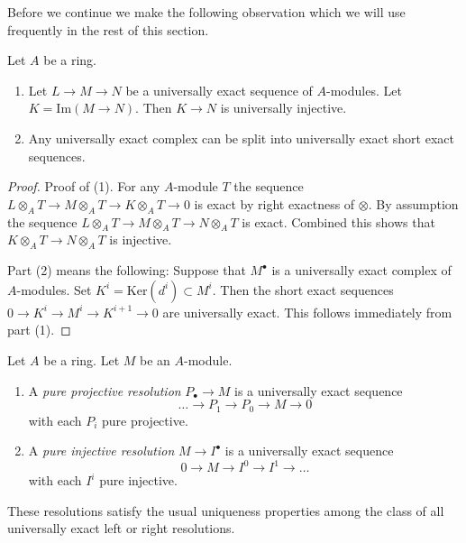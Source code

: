 \noindent
Before we continue we make the following observation which we will
use frequently in the rest of this section.

\begin{lemma}
\label{lemma-split-universally-exact-sequence}
Let $A$ be a ring.
\begin{enumerate}
\item Let $L \to M \to N$ be a universally exact sequence
of $A$-modules. Let $K = \text{Im}(M \to N)$.
Then $K \to N$ is universally injective.
\item Any universally exact complex
can be split into universally exact short exact sequences.
\end{enumerate}
\end{lemma}

\begin{proof}
Proof of (1). For any $A$-module $T$ the sequence
$L \otimes_A T \to M \otimes_A T \to K \otimes_A T \to 0$ is exact
by right exactness of $\otimes$. By assumption the sequence
$L \otimes_A T \to M \otimes_A T \to N \otimes_A T$ is exact.
Combined this shows that $K \otimes_A T \to N \otimes_A T$ is injective.

\medskip\noindent
Part (2) means the following: Suppose that $M^\bullet$ is a universally
exact complex of $A$-modules. Set $K^i = \text{Ker}(d^i) \subset M^i$.
Then the short exact sequences $0 \to K^i \to M^i \to K^{i + 1} \to 0$
are universally exact. This follows immediately from part (1).
\end{proof}

\begin{definition}
\label{definition-pure-resolution}
Let $A$ be a ring. Let $M$ be an $A$-module.
\begin{enumerate}
\item A {\it pure projective resolution} $P_\bullet \to M$
is a universally exact sequence
$$
\ldots \to P_1 \to P_0 \to M \to 0
$$
with each $P_i$ pure projective.
\item A {\it pure injective resolution} $M \to I^\bullet$ is a universally
exact sequence
$$
0 \to M \to I^0 \to I^1 \to \ldots
$$
with each $I^i$ pure injective.
\end{enumerate}
\end{definition}

\noindent
These resolutions satisfy the usual uniqueness properties among the class
of all universally exact left or right resolutions.


